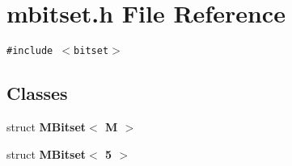 \section{mbitset.h File Reference}
\label{mbitset_8h}
{\tt \#include $<$bitset$>$}\par
\subsection*{Classes}
\begin{CompactItemize}
\item 
struct {\bf MBitset$<$ M $>$}
\item 
struct {\bf MBitset$<$ 5 $>$}
\end{CompactItemize}
